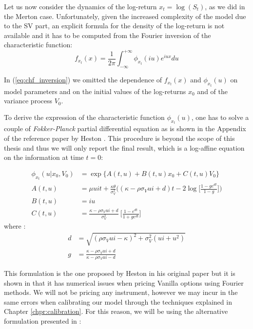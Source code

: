 Let us now consider the dynamics of the log-return $x_t = \log (S_t)$, as we did in the Merton case. 
Unfortunately, given the increased complexity of the model due to the SV part, an explicit formula for the density of the log-return is not available and it has to be computed from the Fourier inversion of the characteristic function:
\begin{equation}
\label{eq:chf_inversion}
f_{x_t}(x) = \frac{1}{2\pi}\int_{-\infty}^{+\infty} \phi_{x_t}(i u) e^{i u x} du
\end{equation}

In (\ref{eq:chf_inversion}) we omitted the dependence of $f_{x_t}(x)$ and $\phi_{x_t}(u)$ on model parameters and on the initial values of the log-returns $x_0$ and of the variance process $V_0$. 

\bigskip

To derive the expression of the characteristic function $\phi_{x_t}(u)$, one has to solve a couple of \textit{Fokker-Planck} partial differential equation as is shown in the Appendix of the reference paper by Heston \cite{HESTON93}. This procedure is beyond the scope of this thesis and thus we will only report the final result, which is a log-affine equation on the information at time $t = 0$:

\begin{subequations}
\begin{align}
	\phi_{x_t}(u| x_0, V_0) &= \exp\{A(t,u) + B(t,u) x_0 + C(t,u) V_0\}\nonumber \\
	A(t,u) &= \mu u i t +  \frac{\kappa\theta}{\sigma_V^2} \bigg( (\kappa - \rho\sigma_V u i +d)t - 2 \log\Big[  \frac{1-ge^{dt}}{1-g} \Big] \bigg)\\
	B(t,u) &= i u \\
	C(t,u)&= \frac{\kappa - \rho\sigma_V u i +d}{\sigma_V^2} \:\Big[\frac{1-e^{dt}}{1+ge^{dt}}\Big]
\end{align}
\end{subequations} 
where :
\begin{equation*}
\begin{split}
d&=\sqrt{(\rho \sigma_V u i - \kappa)^2 + \sigma_V^2(u i + u^2)}\\
g&= \frac{\kappa - \rho\sigma_V u i + d}{\kappa - \rho\sigma_V u i - d}
\end{split}
\end{equation*} 



This formulation is the one proposed by Heston in his original paper \cite{HESTON93} but it is shown in \cite{HESTONTRAP}  that it has numerical issues when  pricing Vanilla options using Fourier methods. We will not be pricing any instrument, however we may incur in the same errors when calibrating our model through the techniques explained in Chapter \ref{chpr:calibration}. For this reason, we will be using the alternative formulation presented in \cite{HESTONTRAP}:



